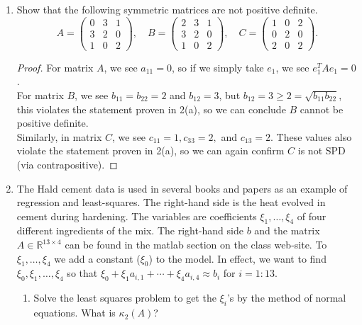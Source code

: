 \documentclass[11pt]{article}
\newcommand{\R}{\mathbb{R}}
\newcommand{\n}{\vspace{0.3cm}}
\begin{document}
\begin{enumerate}
	\item Show that the following symmetric matrices are not positive definite.
	      \[
		      A = \begin{pmatrix} 0 & 3 & 1 \\ 3 & 2 & 0 \\ 1 & 0 & 2 \end{pmatrix}, \quad
		      B = \begin{pmatrix} 2 & 3 & 1 \\ 3 & 2 & 0 \\ 1 & 0 & 2 \end{pmatrix}, \quad
		      C = \begin{pmatrix} 1 & 0 & 2 \\ 0 & 2 & 0 \\ 2 & 0 & 2 \end{pmatrix}.
	      \]
        \begin{proof}
        For matrix \(A\), we see \(a_{11} = 0\), so if we simply take \(e_1\), we see \(e_1^T A e_1 = 0\). \n\\
        For matrix \(B\), we see \(b_{11} = b_{22} = 2\) and \(b_{12} = 3\), but \(b_{12} = 3 \geq 2 = \sqrt{b_{11}b_{22}}\), this violates the statement proven in 2(a), so we can conclude \(B\) cannot be positive definite. \n\\
        Similarly, in matrix \(C\), we see \(c_{11} = 1,  c_{33} = 2,\) and \(c_{13} = 2\).  These values also violate the statement proven in 2(a), so we can again confirm \(C\) is not SPD (via contrapositive).
        \end{proof}

	\item The Hald cement data is used in several books and papers as an example of regression and least-squares.  The right-hand side is the heat evolved in cement during hardening.  The variables are coefficients \(\xi_1, \dots, \xi_4\) of four different ingredients of the mix.  The right-hand side \(b\) and the matrix \(A \in \R^{13 \times 4}\) can be found in the matlab section on the class web-site.  To \(\xi_1, \dots, \xi_4\) we add a constant (\(\xi_0\)) to the model.  In effect, we want to find \(\xi_0, \xi_1, \dots, \xi_4\) so that \(\xi_0 + \xi_1 a_{i,1} + \cdots + \xi_4 a_{i,4} \approx b_i\) for \(i=1:13\).
	      \begin{enumerate}
		      \item Solve the least squares problem to get the \(\xi_i\)'s by the method of normal equations.  What is \(\kappa_2(A)\)?


\end{enumerate}
\end{enumerate}
\end{document}
